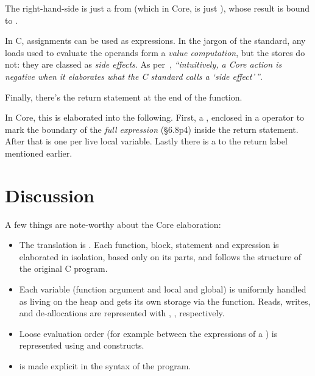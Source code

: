 The right-hand-side is just a  from  %
(which in Core, is just ), whose result is bound to
.


In C, assignments can be used as expressions. In the jargon of the standard,
any loads used to evaluate the operands form a \emph{value computation}, but
the stores do not: they are classed as \emph{side effects}. As
per~\textcite[p61, p66, p99]{memarian2022cerberus}, \emph{``intuitively, a Core action
is negative when it elaborates what the C standard calls a `side
effect'\,''}.


Finally, there's the return statement at the end of the function.


In Core, this is elaborated into the following. First, a
, enclosed in a  operator %
to mark the boundary of the \emph{full expression} (§6.8p4) inside the return
statement. After that is one  per live  %
local variable. Lastly there is a  to the %
return label  mentioned earlier.


\section{Discussion}

A few things are note-worthy about the Core elaboration:
\begin{itemize}
    \item The translation is . Each function, block,
        statement and expression is elaborated in isolation, based only
        on its parts, and follows the structure of the original C program.
    \item Each variable (function argument and local and global) is uniformly
        handled as living on the heap and gets its own storage via the
         function. Reads, writes, and de-allocations are
        represented with , ,
         respectively.
    \item Loose evaluation order (for example between the expressions of a \cinline{==})
        is represented using  and  constructs.
    \item {} is made explicit in the syntax of the program.
\end{itemize}

